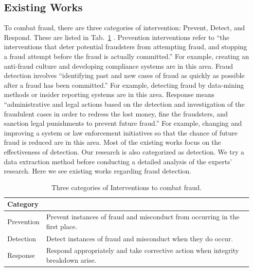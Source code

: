 \documentclass[dvipdfmx, english]{ampmt}             %
\newcommand{\Tabref}[1]{Tab.~\ref{#1}}
\begin{document}

\subsection{Existing Works}

To combat fraud, there are three categories of intervention: Prevent, Detect, and Respond. These are listed in \Tabref{tb:intervention} \cite{Prevention}.
Prevention interventions refer to ``the interventions that deter potential fraudsters from attempting fraud, and stopping a fraud attempt before the fraud is actually committed.'' For example, creating an anti-fraud culture and developing compliance systems are in this area.
Fraud detection involves ``identifying past and new cases of fraud as quickly as possible after a fraud has been committed.'' For example, detecting fraud by data-mining methods or insider reporting systems are in this area.
Response means ``administrative and legal actions based on the detection and investigation of the fraudulent cases in order to redress the lost money, fine the fraudsters, and sanction legal punishments to prevent future fraud.''
For example, changing and improving a system or law enforcement initiatives so that the chance of future fraud is reduced are in this area.
Most of the existing works focus on the effectiveness of detection\cite{NoEvidence}. Our research is also categorized as detection. We
try a data extraction method before conducting a detailed analysis of the experts’ research. Here we see existing works regarding fraud detection.

\begin{table}[H]
\centering
\caption{Three categories of Interventions to combat fraud.}\label{tb:intervention}
\begin{tabularx}{\linewidth}{l X}
\hline \hline
 Category & \\
\hline
Prevention & Prevent instances of fraud and misconduct from occurring in the first place. \\
Detection & Detect instances of fraud and misconduct when they do occur. \\
Response & Respond appropriately and take corrective action when integrity breakdown arise. \\
   \hline
\end{tabularx}
\addtocounter{table}{-1}
\end{table}
\end{document}
